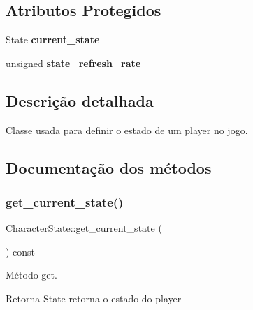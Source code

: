 \subsection*{Atributos Protegidos}
\begin{DoxyCompactItemize}
\item 
\mbox{\label{classCharacterState_a8f034f034b94ccf269d65423f51aa7ec}} 
State {\bfseries current\+\_\+state}
\item 
\mbox{\label{classCharacterState_ac9da3ddf82281b73f8e9471f9cfc9438}} 
unsigned {\bfseries state\+\_\+refresh\+\_\+rate}
\end{DoxyCompactItemize}


\subsection{Descrição detalhada}
Classe usada para definir o estado de um player no jogo. 

\subsection{Documentação dos métodos}
\mbox{\label{classCharacterState_a8abbdb5d82447c225dc54f205c782e8e}} 
\subsubsection{\texorpdfstring{get\+\_\+current\+\_\+state()}{get\_current\_state()}}
{\footnotesize\ttfamily Character\+State\+::get\+\_\+current\+\_\+state (\begin{DoxyParamCaption}{ }\end{DoxyParamCaption}) const\hspace{0.3cm}{\ttfamily [inline]}}



Método get. 

\begin{DoxyReturn}{Retorna}
State retorna o estado do player 
\end{DoxyReturn}
\mbox{\label{classCharacterState_a26ad231cccb89de9c1ed224cf126ca38}} 
